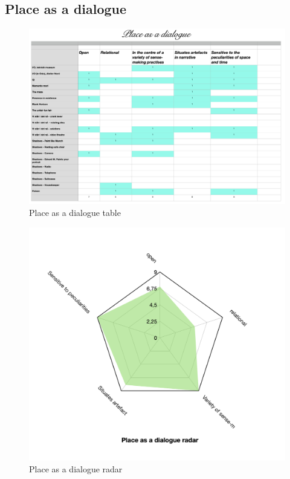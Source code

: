 \subsection{Place as a dialogue}
\begin{figure}[H]
\includegraphics[width=20cm, angle=90]{pictures/analysis/place.png}
\caption{Place as a dialogue table}
\centering 
\end{figure}

\begin{figure}[H]
\includegraphics[width=12.5cm]{pictures/analysis/place_radar.png}
\caption{Place as a dialogue radar}
\centering 
\end{figure}

